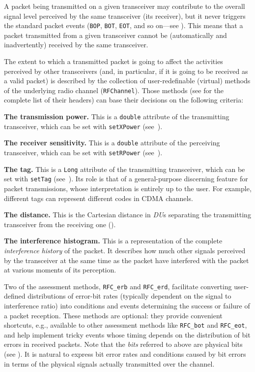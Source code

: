 A packet being transmitted on a given transceiver may contribute to the
overall signal level perceived by the same transceiver (its receiver),
but it never triggers the standard packet events
({\tt BOP}, {\tt BOT}, {\tt EOT}, and so on---see ).
This means that a packet transmitted from a given transceiver cannot be
(automatically and inadvertently) received by the same transceiver.

The extent to which a transmitted packet is going to affect the activities
perceived by other transceivers (and, in particular, if it is going to be
received as a valid packet) is
described by the collection of user-redefinable (virtual) methods of the
underlying radio channel ({\tt RFChannel}).
Those methods (see  for the complete list of their headers)
can base their decisions on the following criteria:

\noindent
{\bf The transmission power.}
This is a {\tt double} attribute of the transmitting transceiver, which can be
set with {\tt setXPower} (see~).

\noindent
{\bf The receiver sensitivity.}
This is a {\tt double} attribute of the perceiving transceiver, which can be
set with {\tt setRPower} (see~).

\noindent
{\bf The tag.}
This is a {\tt Long} attribute of the transmitting transceiver, which can be
set with {\tt setTag} (see~).
Its role is that of a general-purpose discerning feature for packet
transmissions, whose interpretation is entirely up to the user.
For example, different tags can represent different codes in CDMA channels.

\noindent
{\bf The distance.}
This is the Cartesian distance in {\em DU\/}s
separating the transmitting transceiver from
the receiving one ().

\noindent
{\bf The interference histogram.}
This is a representation of the complete {\em interference history\/} of
the packet.
It describes how much other signals perceived by the transceiver at the
same time as the packet have interfered with the packet at various moments of
its perception.

Two of the assessment methods, {\tt RFC\_erb} and {\tt RFC\_erd}, facilitate
converting user-defined distributions of error-bit rates (typically dependent
on the signal to interference ratio) into conditions and events determining
the success or failure of a packet reception.
These methods are optional: they provide convenient shortcuts, e.g., available
to other assessment methods like {\tt RFC\_bot} and {\tt RFC\_eot},
and help implement
tricky events whose timing depends on the distribution of bit errors in
received packets.
Note that the {\em bits\/} referred to above are physical bits
(see ).
It is natural to express bit error rates and conditions caused by bit errors
in terms of the physical signals actually transmitted over the channel.


